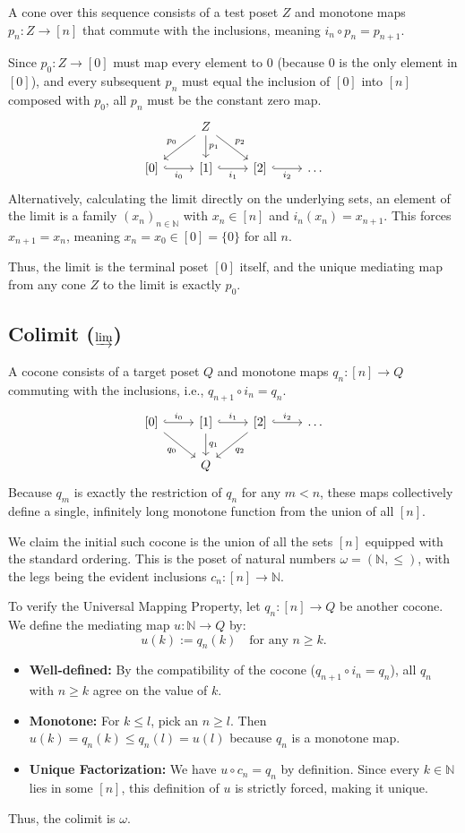 \documentclass[11pt]{article}
\begin{document}
A cone over this sequence consists of a test poset $Z$ and monotone maps $p_n: Z \to [n]$ that commute with the inclusions, meaning $i_n \circ p_n = p_{n+1}$. 

Since $p_0: Z \to [0]$ must map every element to $0$ (because $0$ is the only element in $[0]$), and every subsequent $p_n$ must equal the inclusion of $[0]$ into $[n]$ composed with $p_0$, all $p_n$ must be the constant zero map.
\[
\begin{tikzcd}
& Z \arrow[dl, "p_0"'] \arrow[d, "p_1"] \arrow[dr, "p_2"] & \\
{[0]} \arrow[r, hook, "i_0"'] & {[1]} \arrow[r, hook, "i_1"'] & {[2]} \arrow[r, hook, "i_2"'] & \dots
\end{tikzcd}
\]
Alternatively, calculating the limit directly on the underlying sets, an element of the limit is a family $(x_n)_{n \in \mathbb{N}}$ with $x_n \in [n]$ and $i_n(x_n) = x_{n+1}$. This forces $x_{n+1} = x_n$, meaning $x_n = x_0 \in [0] = \{0\}$ for all $n$. 

Thus, the limit is the terminal poset $[0]$ itself, and the unique mediating map from any cone $Z$ to the limit is exactly $p_0$.

\subsection*{Colimit ($\varinjlim$)}

A cocone consists of a target poset $Q$ and monotone maps $q_n: [n] \to Q$ commuting with the inclusions, i.e., $q_{n+1} \circ i_n = q_n$.
\[
\begin{tikzcd}
{[0]} \arrow[r, hook, "i_0"] \arrow[dr, "q_0"'] & {[1]} \arrow[r, hook, "i_1"] \arrow[d, "q_1"] & {[2]} \arrow[r, hook, "i_2"] \arrow[dl, "q_2"] & \dots \\
& Q & &
\end{tikzcd}
\]
Because $q_m$ is exactly the restriction of $q_n$ for any $m < n$, these maps collectively define a single, infinitely long monotone function from the union of all $[n]$. 

We claim the initial such cocone is the union of all the sets $[n]$ equipped with the standard ordering. This is the poset of natural numbers $\omega = (\mathbb{N}, \leq)$, with the legs being the evident inclusions $c_n: [n] \to \mathbb{N}$. 

To verify the Universal Mapping Property, let $q_n: [n] \to Q$ be another cocone. We define the mediating map $u: \mathbb{N} \to Q$ by:
\[
  u(k) := q_n(k) \quad \text{for any } n \geq k.
\]
\begin{itemize}
    \item \textbf{Well-defined:} By the compatibility of the cocone ($q_{n+1} \circ i_n = q_n$), all $q_n$ with $n \geq k$ agree on the value of $k$.
    \item \textbf{Monotone:} For $k \leq l$, pick an $n \geq l$. Then $u(k) = q_n(k) \leq q_n(l) = u(l)$ because $q_n$ is a monotone map.
    \item \textbf{Unique Factorization:} We have $u \circ c_n = q_n$ by definition. Since every $k \in \mathbb{N}$ lies in some $[n]$, this definition of $u$ is strictly forced, making it unique.
\end{itemize}
Thus, the colimit is $\omega$.
\end{document}
